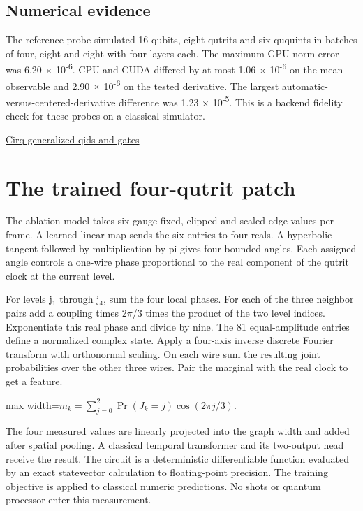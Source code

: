 \documentclass[11pt,oneside,openany]{book}
\begin{document}
\section*{Numerical evidence}
The reference probe simulated 16 qubits, eight qutrits and six ququints in batches of four, eight and eight with four layers each. The maximum GPU norm error was 6.20 \ensuremath{\times} 10\textsuperscript{-}\textsuperscript{6}. CPU and CUDA differed by at most 1.06 \ensuremath{\times} 10\textsuperscript{-}\textsuperscript{6} on the mean observable and 2.90 \ensuremath{\times} 10\textsuperscript{-}\textsuperscript{6} on the tested derivative. The largest automatic-versus-centered-derivative difference was 1.23 \ensuremath{\times} 10\textsuperscript{-}\textsuperscript{5}. This is a backend fidelity check for these probes on a classical simulator.

{\small\sffamily\href{https://quantumai.google/cirq/build/qudits}{Cirq generalized qids and gates}\par}
\chapter{The trained four-qutrit patch}
The ablation model takes six gauge-fixed, clipped and scaled edge values per frame. A learned linear map sends the six entries to four reals. A hyperbolic tangent followed by multiplication by pi gives four bounded angles. Each assigned angle controls a one-wire phase proportional to the real component of the qutrit clock at the current level.

For levels j\ensuremath{_1} through j\ensuremath{_4}, sum the four local phases. For each of the three neighbor pairs add a coupling times 2\ensuremath{\pi}/3 times the product of the two level indices. Exponentiate this real phase and divide by nine. The 81 equal-amplitude entries define a normalized complex state. Apply a four-axis inverse discrete Fourier transform with orthonormal scaling. On each wire sum the resulting joint probabilities over the other three wires. Pair the marginal with the real clock to get a feature.

\begin{center}\begin{adjustbox}{max width=\linewidth}$\displaystyle m_k=\sum_{j=0}^2\Pr(J_k=j)\cos(2\pi j/3).$\end{adjustbox}\end{center}
The four measured values are linearly projected into the graph width and added after spatial pooling. A classical temporal transformer and its two-output head receive the result. The circuit is a deterministic differentiable function evaluated by an exact statevector calculation to floating-point precision. The training objective is applied to classical numeric predictions. No shots or quantum processor enter this measurement.
\end{document}
